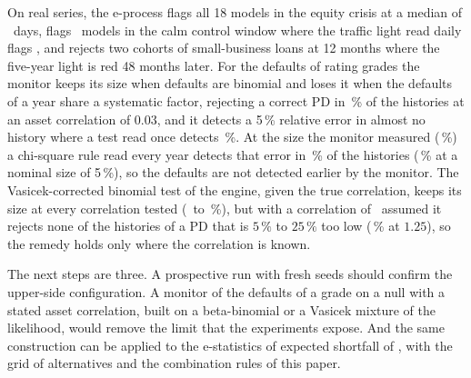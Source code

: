 On real series, the e-process flags all 18 models in the equity crisis at a median of \nCElevenEquityNinetyEMed\ days, flags \nCElevenCalmNinetyEFlag\ models in the calm control window where the traffic light read daily flags \nCElevenCalmNinetyLightFlag, and rejects two cohorts of small-business loans at 12 months where the five-year light is red 48 months later. For the defaults of rating grades the monitor keeps its size when defaults are binomial and loses it when the defaults of a year share a systematic factor, rejecting a correct PD in \nRhoZeroThreeAvg\,\% of the histories at an asset correlation of $0.03$, and it detects a 5\,\% relative error in almost no history where a test read once detects \nPdOneZeroFiveChiOne\,\%. At the size the monitor measured (\nPdcMatchedSize\,\%) a chi-square rule read every year detects that error in \nPdcOneZeroFiveChiMatched\,\% of the histories (\nPdcOneZeroFiveChiSim\,\% at a nominal size of 5\,\%), so the defaults are not detected earlier by the monitor. The Vasicek-corrected binomial test of the engine, given the true correlation, keeps its size at every correlation tested (\nPdcZeroThreeVasTrueEvery\ to \nPdcZeroVasTrueEvery\,\%), but with a correlation of \nPdcAssumedRho\ assumed it rejects none of the histories of a PD that is $5\,\%$ to $25\,\%$ too low (\nPdcOneTwoFiveVasAssumedEvery\,\% at $1.25$), so the remedy holds only where the correlation is known.

The next steps are three. A prospective run with fresh seeds should confirm the upper-side configuration. A monitor of the defaults of a grade on a null with a stated asset correlation, built on a beta-binomial or a Vasicek mixture of the likelihood, would remove the limit that the experiments expose. And the same construction can be applied to the e-statistics of expected shortfall of \citet{wang2022}, with the grid of alternatives and the combination rules of this paper.
